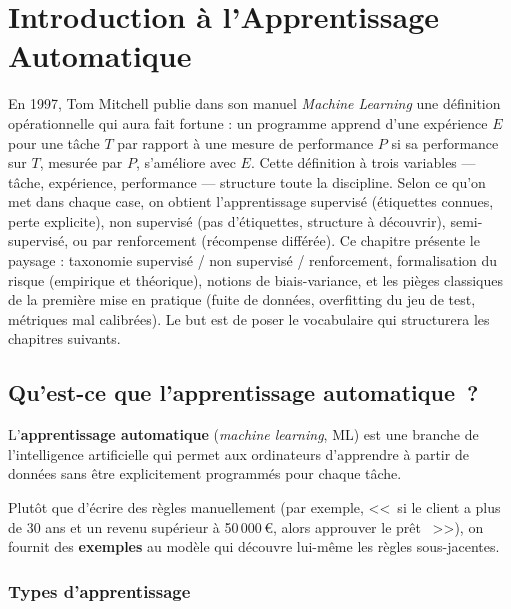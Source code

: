 \chapter{Introduction \`a l'Apprentissage Automatique}
\label{ch:ml_intro}

En 1997, Tom Mitchell publie dans son manuel \emph{Machine Learning} une définition opérationnelle qui aura fait fortune : un programme apprend d'une expérience $E$ pour une tâche $T$ par rapport à une mesure de performance $P$ si sa performance sur $T$, mesurée par $P$, s'améliore avec $E$. Cette définition à trois variables --- tâche, expérience, performance --- structure toute la discipline. Selon ce qu'on met dans chaque case, on obtient l'apprentissage supervisé (étiquettes connues, perte explicite), non supervisé (pas d'étiquettes, structure à découvrir), semi-supervisé, ou par renforcement (récompense différée). Ce chapitre présente le paysage : taxonomie supervisé / non supervisé / renforcement, formalisation du risque (empirique et théorique), notions de biais-variance, et les pièges classiques de la première mise en pratique (fuite de données, overfitting du jeu de test, métriques mal calibrées). Le but est de poser le vocabulaire qui structurera les chapitres suivants.

\section{Qu'est-ce que l'apprentissage automatique~?}

\begin{definition}
L'\textbf{apprentissage automatique} (\textit{machine learning}, ML) est une branche de l'intelligence artificielle qui permet aux ordinateurs d'apprendre \`a partir de donn\'ees sans \^etre explicitement programm\'es pour chaque t\^ache.
\end{definition}

\begin{intuition}
Plut\^ot que d'\'ecrire des r\`egles manuellement (par exemple, <<~si le client a plus de 30 ans et un revenu sup\'erieur \`a 50\,000\,€, alors approuver le pr\^et ~>>), on fournit des \textbf{exemples} au mod\`ele qui d\'ecouvre lui-m\^eme les r\`egles sous-jacentes.
\end{intuition}

\subsection{Types d'apprentissage}

